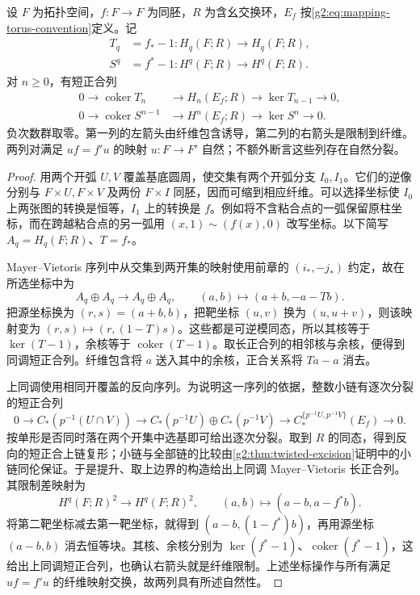 \begin{theorem}\label{g2:thm:mapping-torus-sequences}
	设 \(F\) 为拓扑空间，\(f:F\to F\) 为同胚，\(R\) 为含幺交换环，\(E_f\) 按\eqref{g2:eq:mapping-torus-convention}定义。记
	\[
		\begin{aligned}
			T_q&=f_*-1:H_q(F;R)\longrightarrow H_q(F;R),\\
			S^q&=f^*-1:H^q(F;R)\longrightarrow H^q(F;R).
		\end{aligned}
	\]
	对 \(n\geq0\)，有短正合列
	\[
		\begin{aligned}
			0\longrightarrow\operatorname{coker}T_n&\longrightarrow H_n(E_f;R)\longrightarrow\ker T_{n-1}\longrightarrow0,\\
			0\longrightarrow\operatorname{coker}S^{n-1}&\longrightarrow H^n(E_f;R)\longrightarrow\ker S^n\longrightarrow0.
		\end{aligned}
	\]
	负次数群取零。第一列的左箭头由纤维包含诱导，第二列的右箭头是限制到纤维。两列对满足 \(uf=f'u\) 的映射 \(u:F\to F'\) 自然；不额外断言这些列存在自然分裂。
\end{theorem}
\begin{proof}
	用两个开弧 \(U,V\) 覆盖基底圆周，使交集有两个开弧分支 \(I_0,I_1\)。它们的逆像分别与 \(F\times U,F\times V\) 及两份 \(F\times I\) 同胚，因而可缩到相应纤维。可以选择坐标使 \(I_0\) 上两张图的转换是恒等，\(I_1\) 上的转换是 \(f\)。例如将不含粘合点的一弧保留原柱坐标，而在跨越粘合点的另一弧用 \((x,1)\sim(f(x),0)\) 改写坐标。以下简写 \(A_q=H_q(F;R)\)、\(T=f_*\)。

	Mayer--Vietoris 序列中从交集到两开集的映射使用前章的 \((i_*,-j_*)\) 约定，故在所选坐标中为
	\[
		A_q\oplus A_q\longrightarrow A_q\oplus A_q,\qquad (a,b)\longmapsto(a+b,-a-Tb).
	\]
	把源坐标换为 \((r,s)=(a+b,b)\)，把靶坐标 \((u,v)\) 换为 \((u,u+v)\)，则该映射变为 \((r,s)\mapsto(r,(1-T)s)\)。这些都是可逆模同态，所以其核等于 \(\ker(T-1)\)，余核等于 \(\operatorname{coker}(T-1)\)。取长正合列的相邻核与余核，便得到同调短正合列。纤维包含将 \(a\) 送入其中的余核，正合关系将 \(Ta-a\) 消去。

	上同调使用相同开覆盖的反向序列。为说明这一序列的依据，整数小链有逐次分裂的短正合列
	\[
		0\longrightarrow C_*(p^{-1}(U\cap V))\longrightarrow C_*(p^{-1}U)\oplus C_*(p^{-1}V)\longrightarrow C_*^{\{p^{-1}U,p^{-1}V\}}(E_f)\longrightarrow0.
	\]
	按单形是否同时落在两个开集中选基即可给出逐次分裂。取到 \(R\) 的同态，得到反向的短正合上链复形；小链与全部链的比较由\cref{g2:thm:twisted-excision}证明中的小链同伦保证。于是提升、取上边界的构造给出上同调 Mayer--Vietoris 长正合列。其限制差映射为
	\[
		H^q(F;R)^2\longrightarrow H^q(F;R)^2,
		\qquad(a,b)\longmapsto(a-b,a-f^*b).
	\]
	将第二靶坐标减去第一靶坐标，就得到 \((a-b,(1-f^*)b)\)，再用源坐标 \((a-b,b)\) 消去恒等块。其核、余核分别为 \(\ker(f^*-1)\)、\(\operatorname{coker}(f^*-1)\)，这给出上同调短正合列，也确认右箭头就是纤维限制。上述坐标操作与所有满足 \(uf=f'u\) 的纤维映射交换，故两列具有所述自然性。
\end{proof}

